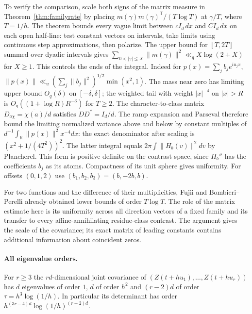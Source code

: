 \documentclass[11pt]{article}
\begin{document}
To verify the comparison, scale both signs of the matrix measure in
Theorem~\ref{thm:familyrate} by placing $m(\gamma)m(\gamma)^{\mathsf T}/(T\log T)$
at $\gamma/T$, where $T=1/h$. The theorem bounds every vague limit
between $c I_d\,dx$ and $C I_d\,dx$ on each open half-line: test
constant vectors on intervals, take limits using continuous step
approximations, then polarize. The upper bound for $[T,2T]$ summed
over dyadic intervals gives $\sum_{0<|\gamma|\le X}\|m(\gamma)\|^2
\ll_q X\log(2+X)$ for $X\ge1$. This controls the ends of the integral.
Indeed for $p(x)=\sum_j b_j e^{iu_jx}$,
$\|p(x)\|\ll_u (\sum_j\|b_j\|^2)^{1/2}\min(x^2,1)$.
The mass near zero has limiting upper bound $O_q(\delta)$ on
$[-\delta,\delta]$; the weighted tail with weight $|x|^{-4}$
on $|x|>R$ is $O_q((1+\log R)R^{-3})$ for $T\ge2$.
The character-to-class matrix
$D_{a\chi}=\overline{\chi(a)}/d$ satisfies $DD^*=I_d/d$.
The ramp expansion and Parseval therefore bound the limiting normalized
variance above and below by constant multiples of
$d^{-1}\int_{\mathbb R}\|p(x)\|^2x^{-4}dx$:
the exact denominator after scaling is $(x^2+1/(4T^2))^2$.
The latter integral equals $2\pi\int\|H_b(v)\|^2dv$ by Plancherel.
This form is positive definite on the contrast space, since $H_b''$
has the coefficients $b_j$ as its atoms. Compactness of its unit sphere
gives uniformity. For offsets $(0,1,2)$ use $(b_1,b_2,b_3)=(b,-2b,b)$.

For two functions and the difference of their multiplicities, Fujii and
Bombieri--Perelli \cite{bp} already obtained lower bounds of order $T\log T$.
The role of the matrix estimate here is its uniformity across all
direction vectors of a fixed family and its transfer to every
affine-annihilating residue-class contrast. The argument gives the scale
of the covariance; its exact matrix of leading constants contains
additional information about coincident zeros.

\paragraph{All eigenvalue orders.}
For $r\ge3$ the $rd$-dimensional joint covariance of
$(Z(t+h u_1),\ldots,Z(t+h u_r))$ has $d$ eigenvalues of order $1$,
$d$ of order $h^2$ and $(r-2)d$ of order $\tau=h^3\log(1/h)$.
In particular its determinant has order $h^{(3r-4)d}\log(1/h)^{(r-2)d}$.
\end{document}
